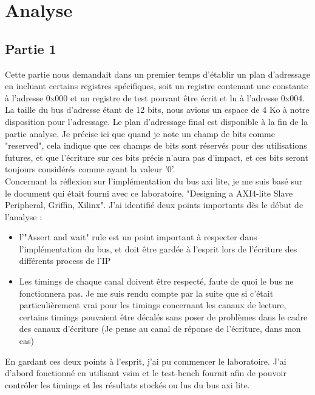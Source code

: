 \section{Analyse}

\subsection{Partie 1}
Cette partie nous demandait dans un premier temps d'établir un plan d'adressage en incluant certains registres spécifiques, soit un registre contenant une constante à l'adresse 0x000 et un registre de test pouvant être écrit et lu à l'adresse 0x004. La taille du bus d'adresse étant de 12 bits, nous avions un espace de 4 Ko à notre disposition pour l'adressage. Le plan d'adressage final est disponible à la fin de la partie analyse. Je précise ici que quand je note un champ de bits comme "reserved", cela indique que ces champs de bits sont réservés pour des utilisations futures, et que l'écriture sur ces bits précis n'aura pas d'impact, et ces bits seront toujours considérés comme ayant la valeur '0'.\\

Concernant la réflexion sur l'implémentation du bus axi lite, je me suis basé sur le document qui était fourni avec ce laboratoire, "Designing a AXI4-lite Slave Peripheral, Griffin, Xilinx". J'ai identifié deux points importants dès le début de l'analyse : \\
\begin{itemize}
	\item l'"Assert and wait" rule est un point important à respecter dans l'implémentation du bus, et doit être gardée à l'esprit lors de l'écriture des différents process de l'IP
	\item Les timings de chaque canal doivent être respecté, faute de quoi le bus ne fonctionnera pas. Je me suis rendu compte par la suite que si c'était particulièrement vrai pour les timings concernant les canaux de lecture, certains timings pouvaient être décalés sans poser de problèmes dans le cadre des canaux d'écriture (Je pense au canal de réponse de l'écriture, dans mon cas)\\
\end{itemize}
En gardant ces deux points à l'esprit, j'ai pu commencer le laboratoire. J'ai d'abord fonctionné en utilisant vsim et le test-bench fournit afin de pouvoir contrôler les timings et les résultats stockés ou lus du bus axi lite.
